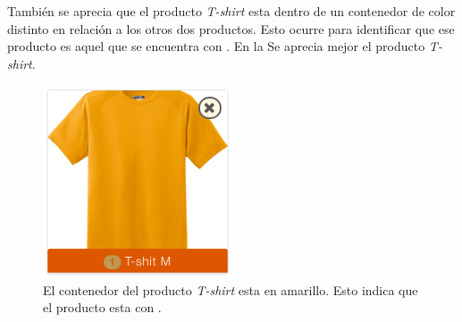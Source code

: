		También se aprecia que el producto \textit{T-shirt} esta dentro de un contenedor de color distinto en relación a los otros dos productos. Esto ocurre para identificar que ese producto es aquel que se encuentra con  \limitedStockEF. En la  Se aprecia mejor el producto \textit{T-shirt}.

		\begin{figure}[H]
			\centering
			\includegraphics[width=0.5\textwidth]{figuras/cart/ui/item_warning.png}
			\caption{El contenedor del producto \textit{T-shirt} esta en amarillo. Esto indica que el producto esta con \limitedStockEF.}
			\label{figure:cart:ui:item_warning}
		\end{figure}
